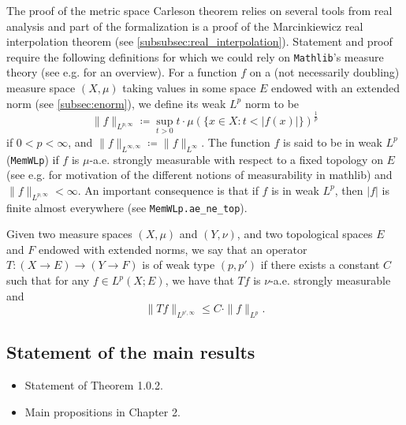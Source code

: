 \documentclass[12pt]{amsart}
\newcommand{\lean}[1]{\texttt{#1}}
\newcommand{\mathlib}{\texttt{Mathlib}\xspace}
\begin{document}
The proof of the metric space Carleson theorem relies on several tools from real analysis and part of the formalization is a proof of the Marcinkiewicz real interpolation theorem (see \ref{subsubsec:real_interpolation}). Statement and proof require the following definitions for which we could rely on \mathlib's measure theory (see e.g. \cite{vanDoornFormalizedHaarMeasure} for an overview).
For a function $f$ on a (not necessarily doubling) measure space $(X,\mu)$ taking values in some space $E$ endowed with an extended norm (see \ref{subsec:enorm}), we define its weak $L^p$ norm to be
\begin{equation}
  \|f\|_{L^{p,\infty}} \coloneq \sup_{t>0} t \cdot \mu (\{x\in X : t < |f(x)| \}) ^ \frac{1}{p}
\end{equation}
if $0<p<\infty$, and $\|f\|_{L^{\infty,\infty}} \coloneq \|f\|_{L^{\infty}}$.
The function $f$ is said to be in weak $L^p$ (\lean{MemWLp}) if $f$ is $\mu$-a.e. strongly measurable with respect to a fixed topology on $E$ (see e.g. \cite{vanDoornFormalizedHaarMeasure, GouezelChangeOfVariables} for motivation of the different notions of measurability in mathlib) and $\|f\|_{L^{p,\infty}} < \infty$.
An important consequence is that if $f$ is in weak $L^p$, then $|f|$ is finite almost everywhere (see \lean{MemWLp.ae_ne_top}).

Given two measure spaces $(X,\mu)$ and $(Y,\nu)$, and two topological spaces $E$ and $F$ endowed with extended norms, we say that an operator $T : (X \to E) \to (Y \to F)$ is of weak type $(p,p')$ if there exists a constant $C$ such that for any $f\in L^p(X; E)$, we have that $T f$ is $\nu$-a.e. strongly measurable and
\begin{equation}
  \|T f\|_{L^{p',\infty}} \le C \cdot \|f\|_{L^p}.
\end{equation}

\subsection{Statement of the main results}\label{subsec:main_results}

\begin{itemize}
	\item Statement of Theorem 1.0.2.
	\item Main propositions in Chapter 2.

\end{itemize}
\end{document}

